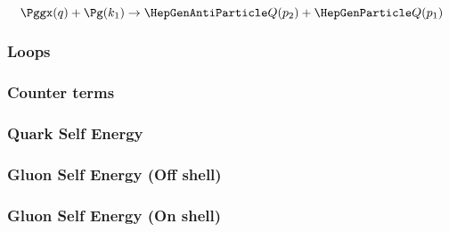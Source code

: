 \begin{equation}
\Pggx(q) + \Pg(k_1) \rightarrow \PaQ(p_2) + \PQ(p_1)
\end{equation}

\subsubsection{Loops}


\subsubsection{Counter terms}


\subsubsection{Quark Self Energy}


\pagebreak
\subsubsection{Gluon Self Energy (Off shell)}


\subsubsection{Gluon Self Energy (On shell)}

